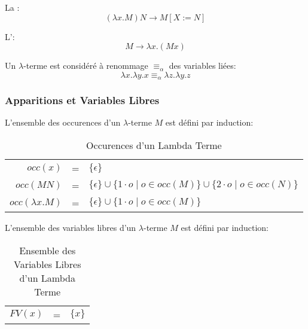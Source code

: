 \documentclass[math]{cours}
\begin{document}
La \betared:
\begin{equation*}
	\left(\lambda x.M\right) N \longrightarrow M\left[X:=N\right]
\end{equation*}

L'\etaexp:
\begin{equation*}
	M\longrightarrow \lambda x.\left(M x\right)
\end{equation*}

\begin{remarque}
	Un $\lambda$-terme est considéré à renommage $\equiv_{\alpha}$ des variables liées:
	\begin{equation*}
		\lambda x.\lambda y.x \equiv_{\alpha} \lambda z.\lambda y.z
	\end{equation*}
\end{remarque}

\subsubsection{Apparitions et Variables Libres}
L'ensemble des occurences d'un $\lambda$-terme $M$ est défini par induction:
\begin{table}
	\centering
	\begin{tabular}{rcl}%
		$occ(x)$ & = & $\{\epsilon\}$\\
		$occ(MN)$ & = & $\{\epsilon\} \cup \{1\cdot o\mid o\in occ(M)\} \cup \{2\cdot o\mid o \in occ(N)\}$\\
		$occ(\lambda x.M)$ & = & $\{\epsilon\} \cup \{1 \cdot o\mid o\in occ(M)\}$
	\end{tabular}
	\caption{Occurences d'un Lambda Terme}
	\label{tab:occurences}
\end{table}

L'ensemble des variables libres d'un $\lambda$-terme $M$ est défini par induction:
\begin{table}
	\centering
	\begin{tabular}{rcl}
	$FV(x)$ & = & $\{x\}$\\

	\end{tabular}
	\caption{Ensemble des Variables Libres d'un Lambda Terme}
	\label{tab:freevars}
\end{table}
\end{document}
